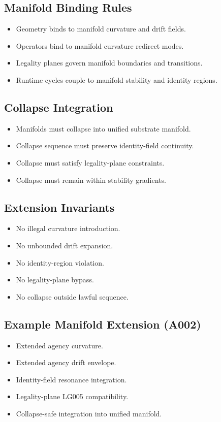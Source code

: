 \subsection{Manifold Binding Rules}
\begin{itemize}
    \item Geometry binds to manifold curvature and drift fields.
    \item Operators bind to manifold curvature redirect modes.
    \item Legality planes govern manifold boundaries and transitions.
    \item Runtime cycles couple to manifold stability and identity regions.
\end{itemize}

\subsection{Collapse Integration}
\begin{itemize}
    \item Manifolds must collapse into unified substrate manifold.
    \item Collapse sequence must preserve identity-field continuity.
    \item Collapse must satisfy legality-plane constraints.
    \item Collapse must remain within stability gradients.
\end{itemize}

\subsection{Extension Invariants}
\begin{itemize}
    \item No illegal curvature introduction.
    \item No unbounded drift expansion.
    \item No identity-region violation.
    \item No legality-plane bypass.
    \item No collapse outside lawful sequence.
\end{itemize}

\subsection{Example Manifold Extension (A002)}
\begin{itemize}
    \item Extended agency curvature.
    \item Extended agency drift envelope.
    \item Identity-field resonance integration.
    \item Legality-plane LG005 compatibility.
    \item Collapse-safe integration into unified manifold.
\end{itemize}
